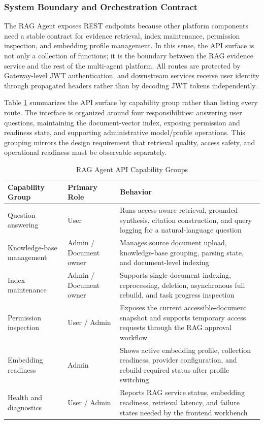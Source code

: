 \subsubsection{System Boundary and Orchestration Contract}

The RAG Agent exposes REST endpoints because other platform components need a stable contract for evidence retrieval, index maintenance, permission inspection, and embedding profile management. In this sense, the API surface is not only a collection of functions; it is the boundary between the RAG evidence service and the rest of the multi-agent platform. All routes are protected by Gateway-level JWT authentication, and downstream services receive user identity through propagated headers rather than by decoding JWT tokens independently.

Table \ref{tab:rag-agent-api} summarizes the API surface by capability group rather than listing every route. The interface is organized around four responsibilities: answering user questions, maintaining the document-vector index, exposing permission and readiness state, and supporting administrative model/profile operations. This grouping mirrors the design requirement that retrieval quality, access safety, and operational readiness must be observable separately.

\vspace{3mm}

\begin{table}[H]
\small\singlespacing
\centering
\caption{RAG Agent API Capability Groups}
\label{tab:rag-agent-api}
\vspace{2mm}

\begin{tabularx}{\textwidth}{>{\RaggedRight\arraybackslash}p{}>{\RaggedRight\arraybackslash}p{}>{\RaggedRight\arraybackslash}X}
\toprule
\textbf{Capability Group} & \textbf{Primary Role} & \textbf{Behavior} \\
\midrule
Question answering & User & Runs access-aware retrieval, grounded synthesis, citation construction, and query logging for a natural-language question \\
Knowledge-base management & Admin / Document owner & Manages source document upload, knowledge-base grouping, parsing state, and document-level indexing \\
Index maintenance & Admin / Document owner & Supports single-document indexing, reprocessing, deletion, asynchronous full rebuild, and task progress inspection \\
Permission inspection & User / Admin & Exposes the current accessible-document snapshot and supports temporary access requests through the RAG approval workflow \\
Embedding readiness & Admin & Shows active embedding profile, collection readiness, provider configuration, and rebuild-required status after profile switching \\
Health and diagnostics & User / Admin & Reports RAG service status, embedding readiness, retrieval latency, and failure states needed by the frontend workbench \\
\bottomrule
\end{tabularx}
\end{table}


